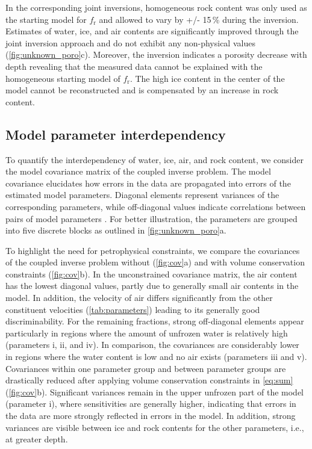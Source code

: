 \documentclass[extra]{gji}
\begin{document}
In the corresponding joint inversions, homogeneous rock content was only used as the starting model for $f_\text{r}$ and allowed to vary by +/- 15\,\% during the inversion.
Estimates of water, ice, and air contents are significantly improved through the joint inversion approach and do not exhibit any non-physical values (\autoref{fig:unknown_poro}c).
Moreover, the inversion indicates a porosity decrease with depth revealing that the measured data cannot be explained with the homogeneous starting model of $f_\text{r}$.
The high ice content in the center of the model cannot be reconstructed and is compensated by an increase in rock content.

\subsection{Model parameter interdependency}
To quantify the interdependency of water, ice, air, and rock content, we consider the model covariance matrix of the coupled inverse problem.
The model covariance elucidates how errors in the data are propagated into errors of the estimated model parameters.
Diagonal elements represent variances of the corresponding parameters, while off-diagonal values indicate correlations between pairs of model parameters \citep[e.g.,][]{Aster2012}.
For better illustration, the parameters are grouped into five discrete blocks as outlined in \autoref{fig:unknown_poro}a.

To highlight the need for petrophysical constraints, we compare the covariances of the coupled inverse problem without (\autoref{fig:cov}a) and with volume conservation constraints (\autoref{fig:cov}b).
In the unconstrained covariance matrix, the air content has the lowest diagonal values, partly due to generally small air contents in the model.
In addition, the velocity of air differs significantly from the other constituent velocities (\autoref{tab:parameters}) leading to its generally good discriminability.
For the remaining fractions, strong off-diagonal elements appear particularly in regions where the amount of unfrozen water is relatively high (parameters i, ii, and iv).
In comparison, the covariances are considerably lower in regions where the water content is low and no air exists (parameters iii and v).
Covariances within one parameter group and between parameter groups are drastically reduced after applying volume conservation constraints in \autoref{eq:sum} (\autoref{fig:cov}b).
Significant variances remain in the upper unfrozen part of the model (parameter i), where sensitivities are generally higher, indicating that errors in the data are more strongly reflected in errors in the model.
In addition, strong variances are visible between ice and rock contents for the other parameters, i.e., at greater depth.
\end{document}
